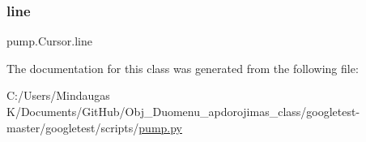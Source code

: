 \subsubsection{\texorpdfstring{line}{line}}
{\footnotesize\ttfamily pump.\+Cursor.\+line}



The documentation for this class was generated from the following file\+:\begin{DoxyCompactItemize}
\item 
C\+:/\+Users/\+Mindaugas K/\+Documents/\+Git\+Hub/\+Obj\+\_\+\+Duomenu\+\_\+apdorojimas\+\_\+class/googletest-\/master/googletest/scripts/\mbox{\hyperlink{googletest-master_2googletest_2scripts_2pump_8py}{pump.\+py}}\end{DoxyCompactItemize}
